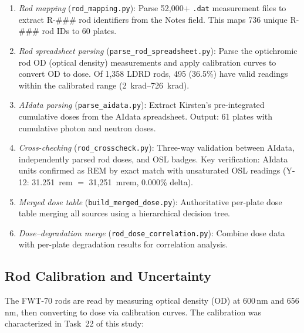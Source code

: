 \documentclass[11pt,letterpaper]{article}
\begin{document}
\begin{enumerate}
    \item \emph{Rod mapping} (\texttt{rod\_mapping.py}): Parse 52,000+
    \texttt{.dat} measurement files to extract R-\#\#\# rod identifiers from
    the Notes field. This maps 736 unique R-\#\#\# rod IDs to 60 plates.

    \item \emph{Rod spreadsheet parsing} (\texttt{parse\_rod\_spreadsheet.py}):
    Parse the optichromic rod OD (optical density) measurements and apply
    calibration curves to convert OD to dose. Of 1,358 LDRD rods, 495 (36.5\%)
    have valid readings within the calibrated range (\SIrange{2}{726}{krad}).

    \item \emph{AIdata parsing} (\texttt{parse\_aidata.py}): Extract Kirsten's
    pre-integrated cumulative doses from the AIdata spreadsheet. Output: 61
    plates with cumulative photon and neutron doses.

    \item \emph{Cross-checking} (\texttt{rod\_crosscheck.py}): Three-way
    validation between AIdata, independently parsed rod doses, and OSL badges.
    Key verification: AIdata units confirmed as REM by exact match with
    unsaturated OSL readings (Y-12: 31.251~rem $=$ 31,251~mrem, 0.000\% delta).

    \item \emph{Merged dose table} (\texttt{build\_merged\_dose.py}):
    Authoritative per-plate dose table merging all sources using a hierarchical
    decision tree.

    \item \emph{Dose--degradation merge} (\texttt{rod\_dose\_correlation.py}):
    Combine dose data with per-plate degradation results for correlation
    analysis.
\end{enumerate}

\subsection{Rod Calibration and Uncertainty}
\label{sec:rod_calibration}

The FWT-70 rods are read by measuring optical density (OD) at 600\,nm and
656\,nm, then converting to dose via calibration curves. The calibration was
characterized in Task~22 of this study:
\end{document}
